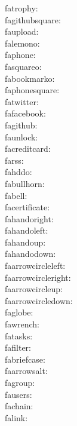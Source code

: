 fatrophy: {\FA \fatrophy} \\
fagithubsquare: {\FA \fagithubsquare} \\
faupload: {\FA \faupload} \\
falemono: {\FA \falemono} \\
faphone: {\FA \faphone} \\
fasquareo: {\FA \fasquareo} \\
fabookmarko: {\FA \fabookmarko} \\
faphonesquare: {\FA \faphonesquare} \\
fatwitter: {\FA \fatwitter} \\
fafacebook: {\FA \fafacebook} \\
fagithub: {\FA \fagithub} \\
faunlock: {\FA \faunlock} \\
facreditcard: {\FA \facreditcard} \\
farss: {\FA \farss} \\
fahddo: {\FA \fahddo} \\
fabullhorn: {\FA \fabullhorn} \\
fabell: {\FA \fabell} \\
facertificate: {\FA \facertificate} \\
fahandoright: {\FA \fahandoright} \\
fahandoleft: {\FA \fahandoleft} \\
fahandoup: {\FA \fahandoup} \\
fahandodown: {\FA \fahandodown} \\
faarrowcircleleft: {\FA \faarrowcircleleft} \\
faarrowcircleright: {\FA \faarrowcircleright} \\
faarrowcircleup: {\FA \faarrowcircleup} \\
faarrowcircledown: {\FA \faarrowcircledown} \\
faglobe: {\FA \faglobe} \\
fawrench: {\FA \fawrench} \\
fatasks: {\FA \fatasks} \\
fafilter: {\FA \fafilter} \\
fabriefcase: {\FA \fabriefcase} \\
faarrowsalt: {\FA \faarrowsalt} \\
fagroup: {\FA \fagroup} \\
fausers: {\FA \fausers} \\
fachain: {\FA \fachain} \\
falink: {\FA \falink} \\
